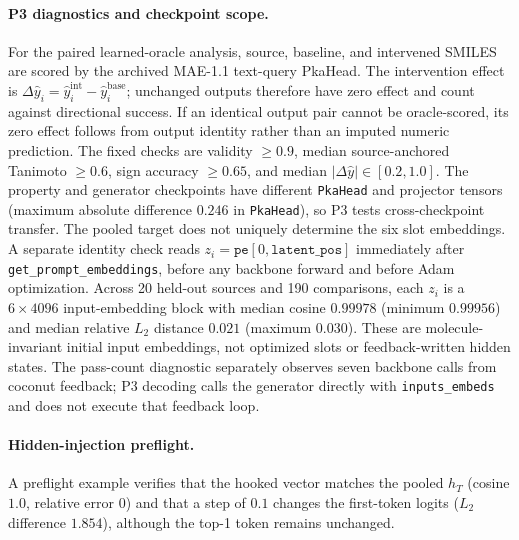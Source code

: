 \documentclass[11pt]{article}
\begin{document}
\paragraph{P3 diagnostics and checkpoint scope.} For the paired learned-oracle analysis, source, baseline, and intervened SMILES are scored by the archived MAE-1.1 text-query PkaHead. The intervention effect is $\Delta\hat y_i=\hat y_i^{\mathrm{int}}-\hat y_i^{\mathrm{base}}$; unchanged outputs therefore have zero effect and count against directional success. If an identical output pair cannot be oracle-scored, its zero effect follows from output identity rather than an imputed numeric prediction. The fixed checks are validity $\geq0.9$, median source-anchored Tanimoto $\geq0.6$, sign accuracy $\geq0.65$, and median $|\Delta\hat y|\in[0.2,1.0]$. The property and generator checkpoints have different \texttt{PkaHead} and projector tensors (maximum absolute difference $0.246$ in \texttt{PkaHead}), so P3 tests cross-checkpoint transfer. The pooled target does not uniquely determine the six slot embeddings. A separate identity check reads $z_i=\texttt{pe}[0,\texttt{latent\_pos}]$ immediately after \texttt{get\_prompt\_embeddings}, before any backbone forward and before Adam optimization. Across 20 held-out sources and 190 comparisons, each $z_i$ is a $6\times4096$ input-embedding block with median cosine $0.99978$ (minimum $0.99956$) and median relative $L_2$ distance $0.021$ (maximum $0.030$). These are molecule-invariant initial input embeddings, not optimized slots or feedback-written hidden states. The pass-count diagnostic separately observes seven backbone calls from coconut feedback; P3 decoding calls the generator directly with \texttt{inputs\_embeds} and does not execute that feedback loop.
\label{sec:p3_diagnostics_appendix}

\paragraph{Hidden-injection preflight.} A preflight example verifies that the hooked vector matches the pooled $h_T$ (cosine $1.0$, relative error $0$) and that a step of $0.1$ changes the first-token logits ($L_2$ difference $1.854$), although the top-1 token remains unchanged.
\label{sec:hidden_preflight_appendix}
\end{document}
